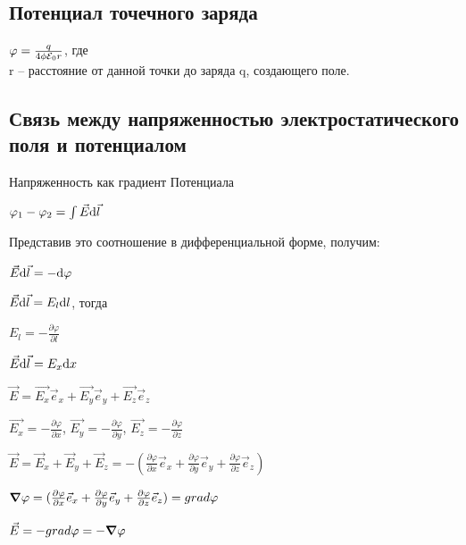 \documentclass[12pt]{report}
\begin{document}
\subsection{Потенциал
    точечного заряда}
\begin{center}
    $\varphi =  \frac{q}{4 \phi \varE_0 r}$, где \\
    r – расстояние от данной точки до заряда q, создающего поле.
\end{center}
\subsection{Связь между напряженностью электростатического
    поля и потенциалом}
Напряженность как градиент Потенциала
\begin{center}
    $\varphi_1 - \varphi_2 = \int \vec{E} \differential \vec{l}$
\end{center}
\par Представив это соотношение в дифференциальной форме, получим:
\begin{center}
    $\vec{E} \differential \vec{l} = - \differential \varphi$
\end{center}
\begin{center}
    $\vec{E} \differential \vec{l} = E_l \differential l$, тогда
\end{center}
\begin{center}
    $E_l  = -\frac{\partial \varphi}{\partial l}$
\end{center}
\begin{center}
    $\vec{E} \differential \vec{l}  = E_x \differential x$
\end{center}
\begin{center}
    $\vec{E}  = \vec{E_x} \vec{e}_x +  \vec{E_y} \vec{e}_y +  \vec{E_z} \vec{e}_z$
\end{center}
\begin{center}
    $\vec{E_x} = -\frac{\partial \varphi}{\partial x}$, $\vec{E_y} = -\frac{\partial \varphi}{\partial y}$, $\vec{E_z} = -\frac{\partial \varphi}{\partial z}$
\end{center}
\begin{center}
    $\vec{E} = \vec{E}_x + \vec{E}_y + \vec{E}_z = -(\frac{\partial \varphi}{\partial x} \vec{e}_x +  \frac{\partial \varphi}{\partial y} \vec{e}_y +  \frac{\partial \varphi}{\partial z} \vec{e}_z)$
\end{center}
\begin{center}
    $\grad \varphi = (\frac{\partial \varphi}{\partial x} \vec{e}_x +  \frac{\partial \varphi}{\partial y} \vec{e}_y +  \frac{\partial \varphi}{\partial z} \vec{e}_z) = grad \varphi$
\end{center}
\begin{center}
    $\vec{E} = -grad \varphi = -\grad \varphi$
\end{center}
\end{document}
